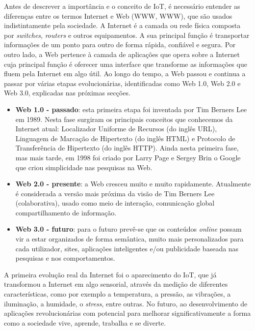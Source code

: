 Antes de descrever a importância e o conceito de \ac{IoT}, é necessário entender as diferenças entre os termos Internet e Web (\acl{WWW}, \acs{WWW}), que são usados indistintamente pela sociedade. A Internet é a camada ou rede física composta por \textit{switches}, \textit{routers} e outros equipamentos\cite{Evans2011a}. A sua principal função é transportar informações de um ponto para outro de forma rápida, confiável e segura. Por outro lado, a Web pertence à camada de aplicações que opera sobre a Internet cuja principal função é oferecer uma interface que transforme as informações que fluem pela Internet em algo útil. Ao longo do tempo, a Web passou e continua a passar por várias etapas evolucionárias, identificadas como Web 1.0, Web 2.0 e Web 3.0, explicadas nas próximas secções.

\begin{itemize}
	\item \textbf{Web 1.0 - passado}: esta primeira etapa foi inventada por Tim Berners Lee em 1989\cite{Getting}. Nesta fase surgiram os principais conceitos que conhecemos da Internet atual: Localizador Uniforme de Recursos (do inglês \ac{URL}), Linguagem de Marcação de Hipertexto (do inglês \ac{HTML}) e Protocolo de Transferência de Hipertexto (do inglês \ac{HTTP}). Ainda nesta primeira fase, mas mais tarde, em 1998 foi criado por Larry Page e Sergey Brin o Google que criou simplicidade nas pesquisas na Web\cite{Lovato2014}. 
	
	\item \textbf{Web 2.0 - presente}: a Web cresceu muito e muito rapidamente. Atualmente é considerada a versão mais próxima da visão de Tim Berners Lee (colaborativa), usado como meio de interação, comunicação global compartilhamento de informação. 
	
	\item \textbf{Web 3.0 - futuro}: para o futuro prevê-se que os conteúdos \textit{online} possam vir a estar organizados de forma semântica, muito mais personalizados para cada utilizador, sites, aplicações inteligentes e/ou publicidade baseada nas pesquisas e nos comportamentos.
\end{itemize}

A  primeira evolução real da Internet foi o aparecimento do \ac{IoT}, que já transformou a Internet em algo sensorial, através da medição de diferentes características, como por exemplo a temperatura, a pressão, as vibrações, a iluminação, a humidade, o \textit{stress}, entre outras. No futuro, ao desenvolvimento de aplicações revolucionárias com potencial para melhorar significativamente a forma como a sociedade vive, aprende, trabalha e se diverte. 

